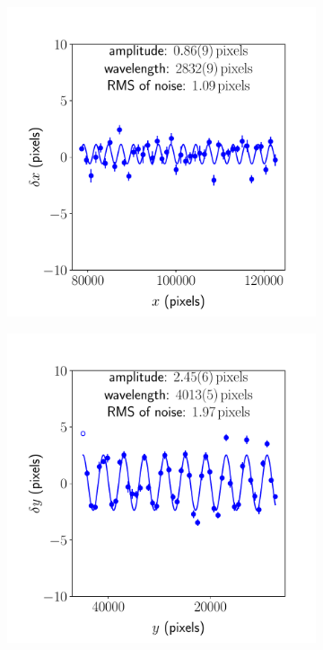\documentclass{article}
\begin{document}
\begin{figure}[ht]
	\centering
	\begin{subfigure}{0.24\linewidth}
	       \includegraphics[width=\linewidth]{sine-wave-xx-1.pdf}
	       \caption{}
	       \label{fig:sinewavexx1}
	\end{subfigure}
	\begin{subfigure}{0.24\linewidth}
	       \includegraphics[width=\linewidth]{sine-wave-yy-1.pdf}

\end{subfigure}
\end{figure}
\end{document}
